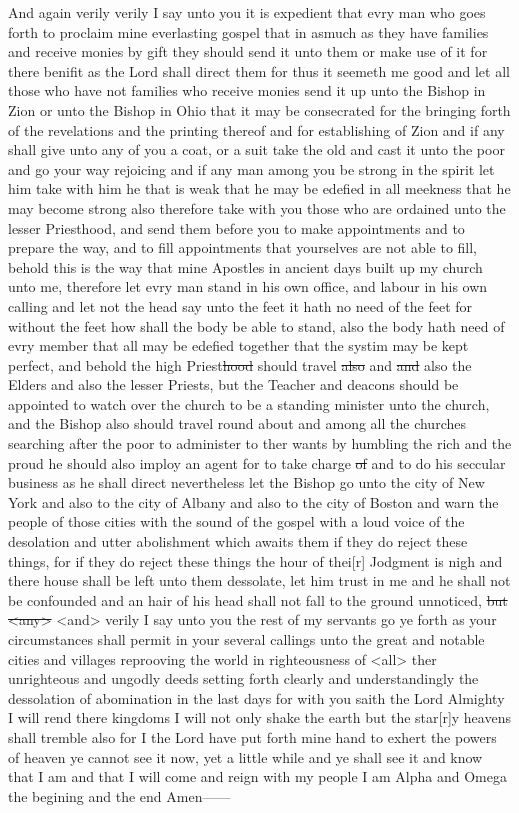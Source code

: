 				And again verily verily I say unto you it is expedient that evry man who goes forth to proclaim mine everlasting gospel that in asmuch as they have families and receive monies by gift they should send it unto them or make use of it for there benifit as the Lord shall direct them for thus it seemeth me good and let all those who have not families who receive monies send it up unto the Bishop in Zion or unto the Bishop in Ohio that it may be consecrated for the bringing forth of the revelations and the printing thereof and for establishing of Zion and if any shall give unto any of you a coat, or a suit take the old and cast it unto the poor and go your way rejoicing and if any man among you be strong in the spirit let him take with him he that is weak that he may be edefied in all meekness that he may become strong also therefore take with you those who are ordained unto the lesser Priesthood, and send them before you to make appointments and to prepare the way, and to fill appointments that yourselves are not able to fill, behold this is the way that mine Apostles in ancient days built up my church unto me, therefore let evry man stand in his own office, and labour in his own calling and let not the head say unto the feet it hath no need of the feet for without the feet how shall the body be able to stand, also the body hath need of evry member that all may be edefied together that the systim may be kept perfect, and behold the high Priest\sout{hood} should travel \sout{also} and \sout{and} also the Elders and also the lesser Priests, but the Teacher and deacons should be appointed to watch over the church to be a standing minister unto the church, and the Bishop also should travel round about and among all the churches searching after the poor to administer to ther wants by humbling the rich and the proud he should also imploy an agent for to take charge \sout{of} and to do his seccular business as he shall direct nevertheless let the Bishop go unto the city of New York and also to the city of Albany and also to the city of Boston and warn the people of those cities with the sound of the gospel with a loud voice of the desolation and utter abolishment which awaits them if they do reject these things, for if they do reject these things the hour of thei[r] Jodgment is nigh and there house shall be left unto them dessolate, let him trust in me and he shall not be confounded and an hair of his head shall not fall to the ground unnoticed, \sout{but} \sout{<any>} <and> verily I say unto you the rest of my servants go ye forth as your circumstances shall permit in your several callings unto the great and notable cities and villages reprooving the world in righteousness of <all> ther unrighteous and ungodly deeds setting forth clearly and understandingly the dessolation of abomination in the last days for with you saith the Lord Almighty I will rend there kingdoms I will not only shake the earth but the star[r]y heavens shall tremble also for I the Lord have put forth mine hand to exhert the powers of heaven ye cannot see it now, yet a little while and ye shall see it and know that I am and that I will come and reign with my people I am Alpha and Omega the begining and the end Amen------

